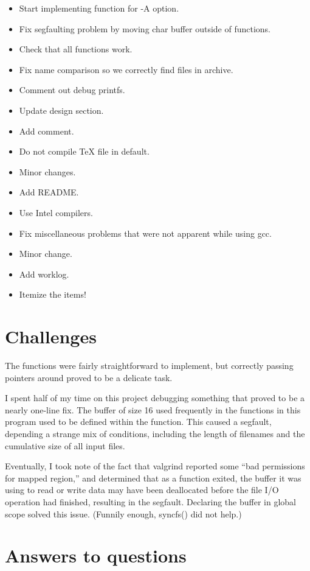 \documentclass[12pt,letterpaper]{article}
\begin{document}
\begin{itemize}
	\item Start implementing function for -A option.
	\item Fix segfaulting problem by moving char buffer outside of functions.
	\item Check that all functions work.
	\item Fix name comparison so we correctly find files in archive.
	\item Comment out debug printfs.
	\item Update design section.
	\item Add comment.
	\item Do not compile TeX file in default.
	\item Minor changes.
	\item Add README.
	\item Use Intel compilers.
	\item Fix miscellaneous problems that were not apparent while using gcc.
	\item Minor change.
	\item Add worklog.
	\item Itemize the items!
\end{itemize}


\section*{Challenges}

The functions were fairly straightforward to implement, but correctly passing
pointers around proved to be a delicate task.

I spent half of my time on this project debugging something that proved to be
a nearly one-line fix. The buffer of size 16 used frequently in the functions
in this program used to be defined within the function. This caused a segfault,
depending a strange mix of conditions, including the length of filenames and
the cumulative size of all input files.

Eventually, I took note of the fact that valgrind reported some ``bad
permissions for mapped region,'' and determined that as a function exited, the
buffer it was using to read or write data may have been deallocated before the
file I/O operation had finished, resulting in the segfault. Declaring the
buffer in global scope solved this issue. (Funnily enough, syncfs() did not
help.)


\section*{Answers to questions}
\end{document}
